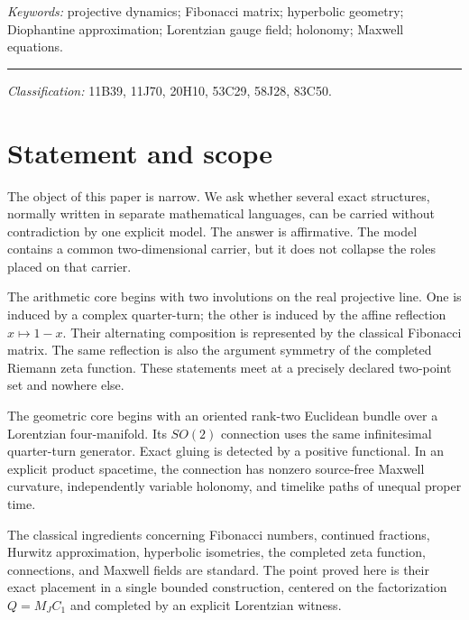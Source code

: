 \documentclass[10pt,oneside]{article}
\theoremstyle{plaincompact}
\theoremstyle{definitioncompact}
\begin{document}
\vspace{0.12in}
\noindent\textit{Keywords:} projective dynamics; Fibonacci matrix; hyperbolic
geometry; Diophantine approximation; Lorentzian gauge field; holonomy;
Maxwell equations.

\vspace{0.18in}
\hrule
\vspace{0.10in}
\noindent\footnotesize
\textit{Classification:} 11B39, 11J70, 20H10, 53C29, 58J28, 83C50.
\normalsize

\section{Statement and scope}

The object of this paper is narrow.  We ask whether several exact structures,
normally written in separate mathematical languages, can be carried without
contradiction by one explicit model.  The answer is affirmative.  The model
contains a common two-dimensional carrier, but it does not collapse the roles
placed on that carrier.

The arithmetic core begins with two involutions on the real projective line.
One is induced by a complex quarter-turn; the other is induced by the affine
reflection $x\mapsto 1-x$.  Their alternating composition is represented by
the classical Fibonacci matrix.  The same reflection is also the argument
symmetry of the completed Riemann zeta function.  These statements meet at a
precisely declared two-point set and nowhere else.

The geometric core begins with an oriented rank-two Euclidean bundle over a
Lorentzian four-manifold.  Its $SO(2)$ connection uses the same infinitesimal
quarter-turn generator.  Exact gluing is detected by a positive functional.
In an explicit product spacetime, the connection has nonzero source-free
Maxwell curvature, independently variable holonomy, and timelike paths of
unequal proper time.

The classical ingredients concerning Fibonacci numbers, continued fractions,
Hurwitz approximation, hyperbolic isometries, the completed zeta function,
connections, and Maxwell fields are standard.  The point proved here is their
exact placement in a single bounded construction, centered on the factorization
$Q=M_JC_1$ and completed by an explicit Lorentzian witness.
\end{document}
